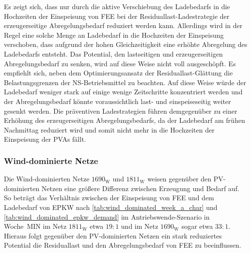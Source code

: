 Es zeigt sich, dass nur durch die aktive Verschiebung des Ladebedarfs in die Hochzeiten der Einspeisung von \gls{FEE} bei der Residuallast-Ladestrategie der erzeugerseitige Abregelungsbedarf reduziert werden kann.
Allerdings wird in der Regel eine solche Menge an Ladebedarf in die Hochzeiten der Einspeisung verschoben, dass aufgrund der hohen Gleichzeitigkeit eine erhöhte Abregelung des Ladebedarfs entsteht.
Das Potential, den lastseitigen und erzeugerseitigen Abregelungsbedarf zu senken, wird auf diese Weise nicht voll ausgeschöpft.
Es empfiehlt sich, neben dem Optimierungsansatz der Residuallast-Glättung die Belastungsgrenzen der \gls{NS}-Betriebsmittel zu beachten.
Auf diese Weise würde der Ladebedarf weniger stark auf einige wenige Zeitschritte konzentriert werden und der Abregelungsbedarf könnte voraussichtlich last- und einspeiseseitig weiter gesenkt werden.
Die präventiven Ladestrategien führen demgegenüber zu einer Erhöhung des erzeugerseitigen Abregelungsbedarfs, da der Ladebedarf am frühen Nachmittag reduziert wird und somit nicht mehr in die Hochzeiten der Einspeisung der \glspl{PVA} fällt.


\subsubsection{Wind-dominierte Netze}\label{chap:wind_cur_results}

Die Wind-dominierten Netze \(1690_{\text{W}}\) und \(1811_{\text{W}}\) weisen gegenüber den \gls{PV}-dominierten Netzen eine größere Differenz zwischen Erzeugung und Bedarf auf.
So beträgt das Verhältnis zwischen der Einspeisung von \gls{FEE} und dem Ladebedarf von \gls{EPKW} nach \autoref{tab:wind_dominated_week_a_char} und \autoref{tab:wind_dominated_epkw_demand} im Antriebswende-Szenario in Woche~MIN im Netz \(1811_{\text{W}}\) etwa \(19:1\) und im Netz \(1690_{\text{W}}\) sogar etwa \(33:1\).
Hieraus folgt gegenüber den \gls{PV}-dominierten Netzen ein stark reduziertes Potential die Residuallast und den Abregelungsbedarf von \gls{FEE} zu beeinflussen.





